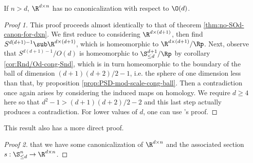\begin{theorem}\label{thm:no-Od-canon-for-dxn}
    If $n > d$, $\R^{d \times n}$ has no canonicalization with respect to $\O(d)$.
    \begin{proof}[Proof 1]
        This proof proceeds almost identically to that of theorem \ref{thm:no-SOd-canon-for-dxn}.
        We first reduce to considering $\R^{d \times (d+1)}$, then find $S^{d(d+1) - 1} \sub \R^{d \times (d+1)}$, which is homeomorphic to $\R^{d \times (d+1)} / \Rp$.
        Next, observe that $S^{d(d+1) - 1}/O(d)$ is homeomorphic to $\S^{d+1}_{\leq d}/\Rp$ by corollary \ref{cor:Rnd/Od-cong-Snd}, which is in turn homeomorphic to the boundary of the ball of dimension $(d+1)(d+2)/2 - 1$, i.e. the sphere of one dimension less than that, by proposition \ref{prop:PSD-mod-scale-cong-ball}.
        Then a contradiction once again arises by considering the induced maps on homology.
        We require $d \geq 4$ here so that $d^2 - 1 > (d+1)(d+2)/2 - 2$ and this last step actually produces a contradiction.
        For lower values of $d$, one can use \cite{dym2024equivariant}'s proof.
    \end{proof}
    This result also has a more direct proof.
    \begin{proof}[Proof 2]
        \Afsoc that we have some canonicalization of $\R^{d \times n}$ and the associated section $s : \S^n_{\leq d} \to \R^{d \times n}$.
    \end{proof}
\end{theorem}

